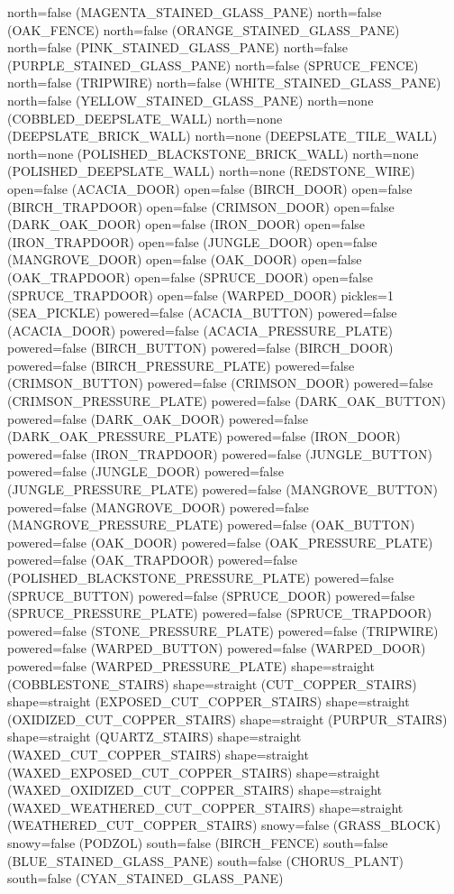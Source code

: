 \documentclass[11pt]{article}
\begin{document}
north=false (MAGENTA_STAINED_GLASS_PANE)
north=false (OAK_FENCE)
north=false (ORANGE_STAINED_GLASS_PANE)
north=false (PINK_STAINED_GLASS_PANE)
north=false (PURPLE_STAINED_GLASS_PANE)
north=false (SPRUCE_FENCE)
north=false (TRIPWIRE)
north=false (WHITE_STAINED_GLASS_PANE)
north=false (YELLOW_STAINED_GLASS_PANE)
north=none (COBBLED_DEEPSLATE_WALL)
north=none (DEEPSLATE_BRICK_WALL)
north=none (DEEPSLATE_TILE_WALL)
north=none (POLISHED_BLACKSTONE_BRICK_WALL)
north=none (POLISHED_DEEPSLATE_WALL)
north=none (REDSTONE_WIRE)
open=false (ACACIA_DOOR)
open=false (BIRCH_DOOR)
open=false (BIRCH_TRAPDOOR)
open=false (CRIMSON_DOOR)
open=false (DARK_OAK_DOOR)
open=false (IRON_DOOR)
open=false (IRON_TRAPDOOR)
open=false (JUNGLE_DOOR)
open=false (MANGROVE_DOOR)
open=false (OAK_DOOR)
open=false (OAK_TRAPDOOR)
open=false (SPRUCE_DOOR)
open=false (SPRUCE_TRAPDOOR)
open=false (WARPED_DOOR)
pickles=1 (SEA_PICKLE)
powered=false (ACACIA_BUTTON)
powered=false (ACACIA_DOOR)
powered=false (ACACIA_PRESSURE_PLATE)
powered=false (BIRCH_BUTTON)
powered=false (BIRCH_DOOR)
powered=false (BIRCH_PRESSURE_PLATE)
powered=false (CRIMSON_BUTTON)
powered=false (CRIMSON_DOOR)
powered=false (CRIMSON_PRESSURE_PLATE)
powered=false (DARK_OAK_BUTTON)
powered=false (DARK_OAK_DOOR)
powered=false (DARK_OAK_PRESSURE_PLATE)
powered=false (IRON_DOOR)
powered=false (IRON_TRAPDOOR)
powered=false (JUNGLE_BUTTON)
powered=false (JUNGLE_DOOR)
powered=false (JUNGLE_PRESSURE_PLATE)
powered=false (MANGROVE_BUTTON)
powered=false (MANGROVE_DOOR)
powered=false (MANGROVE_PRESSURE_PLATE)
powered=false (OAK_BUTTON)
powered=false (OAK_DOOR)
powered=false (OAK_PRESSURE_PLATE)
powered=false (OAK_TRAPDOOR)
powered=false (POLISHED_BLACKSTONE_PRESSURE_PLATE)
powered=false (SPRUCE_BUTTON)
powered=false (SPRUCE_DOOR)
powered=false (SPRUCE_PRESSURE_PLATE)
powered=false (SPRUCE_TRAPDOOR)
powered=false (STONE_PRESSURE_PLATE)
powered=false (TRIPWIRE)
powered=false (WARPED_BUTTON)
powered=false (WARPED_DOOR)
powered=false (WARPED_PRESSURE_PLATE)
shape=straight (COBBLESTONE_STAIRS)
shape=straight (CUT_COPPER_STAIRS)
shape=straight (EXPOSED_CUT_COPPER_STAIRS)
shape=straight (OXIDIZED_CUT_COPPER_STAIRS)
shape=straight (PURPUR_STAIRS)
shape=straight (QUARTZ_STAIRS)
shape=straight (WAXED_CUT_COPPER_STAIRS)
shape=straight (WAXED_EXPOSED_CUT_COPPER_STAIRS)
shape=straight (WAXED_OXIDIZED_CUT_COPPER_STAIRS)
shape=straight (WAXED_WEATHERED_CUT_COPPER_STAIRS)
shape=straight (WEATHERED_CUT_COPPER_STAIRS)
snowy=false (GRASS_BLOCK)
snowy=false (PODZOL)
south=false (BIRCH_FENCE)
south=false (BLUE_STAINED_GLASS_PANE)
south=false (CHORUS_PLANT)
south=false (CYAN_STAINED_GLASS_PANE)
\end{document}
